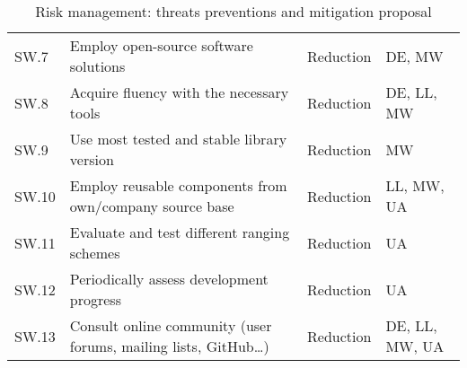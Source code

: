 \begin{table}[H]
\begin{tabular}{@{} m{3em} >{\small}m{20em} m{5em} m{5em} @{}}
    SW.7  & Employ open-source software solutions & Reduction & DE, MW \\
    SW.8  & Acquire fluency with the necessary tools & Reduction & DE, LL, MW \\
    SW.9  & Use most tested and stable library version & Reduction & MW \\
    SW.10  & Employ reusable components from own/company source base & Reduction & LL, MW, UA \\
    SW.11 & Evaluate and test different ranging schemes & Reduction & UA \\
    SW.12 & Periodically assess development progress & Reduction & UA \\
    SW.13 & Consult online community (user forums, mailing lists, GitHub\dots) & Reduction & DE, LL, MW, UA \\
    \bottomrule
\end{tabular}
\caption{Risk management: threats preventions and mitigation proposal}\label{tab:risk_mgmt}
\end{table}
